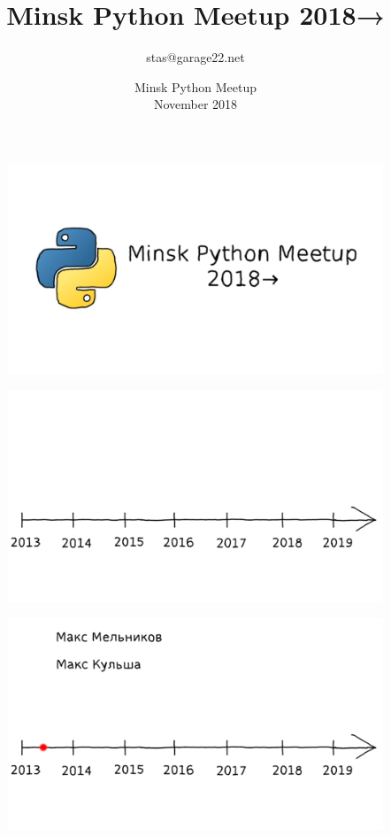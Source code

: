 \documentclass[10pt,pdf,utf8,aspectratio=169,xcolor=dvipsnames,x11names,center]{beamer}
\title{Minsk Python Meetup 2018→}
\author[]{stas@garage22.net}
\date{Minsk Python Meetup\\November 2018}
\begin{document}
\begin{frame}
  \begin{figure}
    \includegraphics[scale=0.88]{Slides-01-title}
  \end{figure}
\end{frame}

\begin{frame}
  \begin{figure}
    \includegraphics[scale=0.88]{Slides-02-01}
  \end{figure}
\end{frame}

\begin{frame}
  \begin{figure}
    \includegraphics[scale=0.88]{Slides-02-02}
  \end{figure}
\end{frame}
\end{document}
